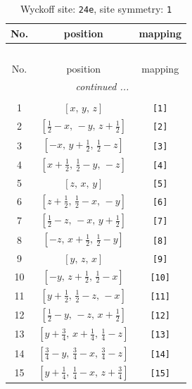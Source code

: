 \documentclass[fleqn,8pt]{jsarticle}
\begin{document}
\begin{longtable}{ccc}
\caption{Wyckoff site: {\tt 24e}, site symmetry: {\tt 1}}
 \\
 \hline \hline
No. & position & mapping \\ \hline \endfirsthead

\multicolumn{2}{l}{\tablename\ \thetable{}} \\
 \hline \hline
No. & position & mapping \\ \hline \endhead

 \hline \hline
\multicolumn{2}{r}{\footnotesize\it continued ...} \\ \endfoot

 \hline \hline
\multicolumn{2}{r}{} \\ \endlastfoot

1 & $\left[ x,\, y,\, z \right]$ & {\tt [1]} \\ \hline
2 & $\left[ \frac{1}{2} - x,\, - y,\, z + \frac{1}{2} \right]$ & {\tt [2]} \\ \hline
3 & $\left[ - x,\, y + \frac{1}{2},\, \frac{1}{2} - z \right]$ & {\tt [3]} \\ \hline
4 & $\left[ x + \frac{1}{2},\, \frac{1}{2} - y,\, - z \right]$ & {\tt [4]} \\ \hline
5 & $\left[ z,\, x,\, y \right]$ & {\tt [5]} \\ \hline
6 & $\left[ z + \frac{1}{2},\, \frac{1}{2} - x,\, - y \right]$ & {\tt [6]} \\ \hline
7 & $\left[ \frac{1}{2} - z,\, - x,\, y + \frac{1}{2} \right]$ & {\tt [7]} \\ \hline
8 & $\left[ - z,\, x + \frac{1}{2},\, \frac{1}{2} - y \right]$ & {\tt [8]} \\ \hline
9 & $\left[ y,\, z,\, x \right]$ & {\tt [9]} \\ \hline
10 & $\left[ - y,\, z + \frac{1}{2},\, \frac{1}{2} - x \right]$ & {\tt [10]} \\ \hline
11 & $\left[ y + \frac{1}{2},\, \frac{1}{2} - z,\, - x \right]$ & {\tt [11]} \\ \hline
12 & $\left[ \frac{1}{2} - y,\, - z,\, x + \frac{1}{2} \right]$ & {\tt [12]} \\ \hline
13 & $\left[ y + \frac{3}{4},\, x + \frac{1}{4},\, \frac{1}{4} - z \right]$ & {\tt [13]} \\ \hline
14 & $\left[ \frac{3}{4} - y,\, \frac{3}{4} - x,\, \frac{3}{4} - z \right]$ & {\tt [14]} \\ \hline
15 & $\left[ y + \frac{1}{4},\, \frac{1}{4} - x,\, z + \frac{3}{4} \right]$ & {\tt [15]} \\ \hline

\end{longtable}
\end{document}
